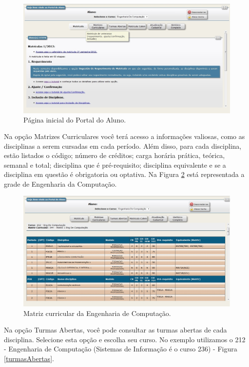 \documentclass[a4paper,12pt,openany]{article}
\begin{document}
	\begin{figure}[ht!] \centering
		\includegraphics[scale=0.4]{mat4.jpg}
		\caption{Página inicial do Portal do Aluno.}
		\label{inicioPortal}
	\end{figure}

Na opção Matrizes Curriculares você terá acesso a informações valiosas, como as disciplinas a serem cursadas em cada período. Além disso, para cada disciplina, estão listados o código; número de créditos; carga horária prática, teórica, semanal e total; disciplina que é pré-requisito; disciplina equivalente e se a disciplina em questão é obrigatoria ou optativa. Na Figura \ref{gradeCurso} está representada a grade de Engenharia da Computação.

	\begin{figure}[h!] \centering
		\includegraphics[scale=0.4]{matrizCurric.jpg}
		\caption{Matriz curricular da Engenharia de Computação.}
		\label{gradeCurso}
	\end{figure}

Na opção Turmas Abertas, você pode consultar as turmas abertas de cada disciplina. Selecione esta opção e escolha seu curso. No exemplo utilizamos o 212 - Engenharia de Computação (Sistemas de Informação é o curso 236) - Figura \ref{turmasAbertas}.
\end{document}

